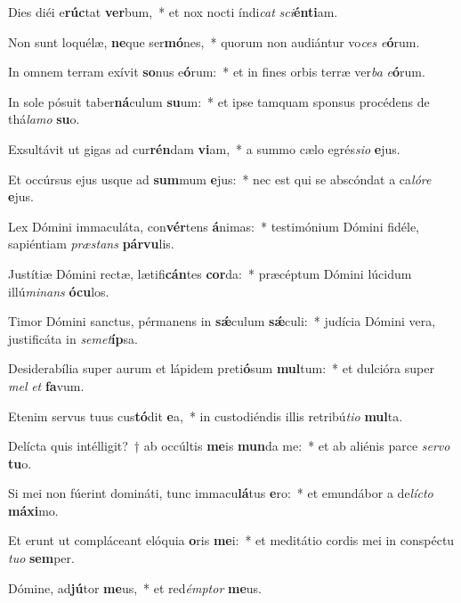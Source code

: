 \item Dies diéi e\textbf{rúc}tat \textbf{ver}bum,~* et nox nocti índi\textit{cat} \textit{sci}\textbf{én}\textbf{ti}am.
\item Non sunt loquélæ, \textbf{ne}que ser\textbf{mó}nes,~* quorum non audiántur vo\textit{ces} \textit{e}\textbf{ó}rum.
\item In omnem terram exívit \textbf{so}nus e\textbf{ó}rum:~* et in fines orbis terræ ver\textit{ba} \textit{e}\textbf{ó}rum.
\item In sole pósuit taber\textbf{ná}culum \textbf{su}um:~* et ipse tamquam sponsus procédens de thá\textit{la}\textit{mo} \textbf{su}o.
\item Exsultávit ut gigas ad cur\textbf{rén}dam \textbf{vi}am,~* a summo cælo egrés\textit{si}\textit{o} \textbf{e}jus.
\item Et occúrsus ejus usque ad \textbf{sum}mum \textbf{e}jus:~* nec est qui se abscóndat a ca\textit{ló}\textit{re} \textbf{e}jus.
\item Lex Dómini immaculáta, con\textbf{vér}tens \textbf{á}nimas:~* testimónium Dómini fidéle, sapiéntiam \textit{præ}\textit{stans} \textbf{pár}\textbf{vu}lis.
\item Justítiæ Dómini rectæ, lætifi\textbf{cán}tes \textbf{cor}da:~* præcéptum Dómini lúcidum illú\textit{mi}\textit{nans} \textbf{ó}\textbf{cu}los.
\item Timor Dómini sanctus, pérmanens in \textbf{sǽ}culum \textbf{sǽ}culi:~* judícia Dómini vera, justificáta in \textit{se}\textit{met}\textbf{íp}sa.
\item Desiderabília super aurum et lápidem preti\textbf{ó}sum \textbf{mul}tum:~* et dulcióra super \textit{mel} \textit{et} \textbf{fa}vum.
\item Etenim servus tuus cus\textbf{tó}dit \textbf{e}a,~* in custodiéndis illis retribú\textit{ti}\textit{o} \textbf{mul}ta.
\item Delícta quis intélligit?~† ab occúltis \textbf{me}is \textbf{mun}da me:~* et ab aliénis parce \textit{ser}\textit{vo} \textbf{tu}o.
\item Si mei non fúerint domináti, tunc immacu\textbf{lá}tus \textbf{e}ro:~* et emundábor a de\textit{líc}\textit{to} \textbf{má}\textbf{xi}mo.
\item Et erunt ut compláceant elóquia \textbf{o}ris \textbf{me}i:~* et meditátio cordis mei in conspéctu \textit{tu}\textit{o} \textbf{sem}per.
\item Dómine, ad\textbf{jú}tor \textbf{me}us,~* et red\textit{émp}\textit{tor} \textbf{me}us.

